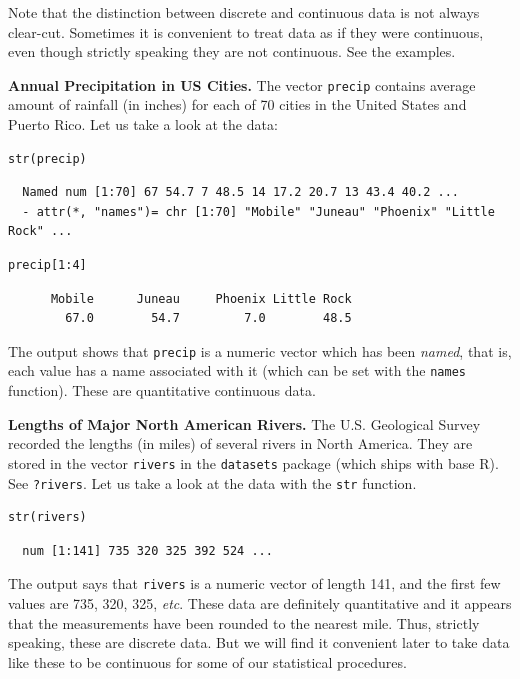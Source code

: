 \documentclass[captions=tableheading]{scrbook}
\begin{document}
Note that the distinction between discrete and continuous data is not always clear-cut. Sometimes it is convenient to treat data as if they were continuous, even though strictly speaking they are not continuous. See the examples.

\begin{example}
\textbf{Annual Precipitation in US Cities.} The vector \texttt{precip} contains average amount of rainfall (in inches) for each of 70 cities in the United States and Puerto Rico. Let us take a look at the data:


\begin{verbatim}
str(precip)
\end{verbatim}

\begin{verbatim}
  Named num [1:70] 67 54.7 7 48.5 14 17.2 20.7 13 43.4 40.2 ...
  - attr(*, "names")= chr [1:70] "Mobile" "Juneau" "Phoenix" "Little Rock" ...
\end{verbatim}


\begin{verbatim}
precip[1:4]
\end{verbatim}

\begin{verbatim}
      Mobile      Juneau     Phoenix Little Rock 
        67.0        54.7         7.0        48.5
\end{verbatim}

The output shows that \texttt{precip} is a numeric vector which has been \emph{named}, that is, each value has a name associated with it (which can be set with the \texttt{names} function). These are quantitative continuous data.

\end{example}

\begin{example}
\textbf{Lengths of Major North American Rivers.} The U.S. Geological Survey recorded the lengths (in miles) of several rivers in North America. They are stored in the vector \texttt{rivers} in the \texttt{datasets} package (which ships with base \textsf{R}). See \texttt{?rivers}. Let us take a look at the data with the \texttt{str} function.


\begin{verbatim}
str(rivers)
\end{verbatim}

\begin{verbatim}
  num [1:141] 735 320 325 392 524 ...
\end{verbatim}

The output says that \texttt{rivers} is a numeric vector of length 141, and the first few values are 735, 320, 325, \emph{etc}. These data are definitely quantitative and it appears that the measurements have been rounded to the nearest mile. Thus, strictly speaking, these are discrete data. But we will find it convenient later to take data like these to be continuous for some of our statistical procedures. 
\end{example}
\end{document}
